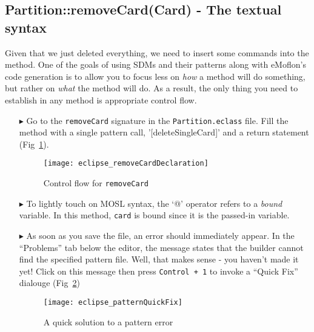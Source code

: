 \newpage
\hypertarget{remCard tex}{}
\subsection{Partition::removeCard(Card) - The textual syntax}
\texHeader

Given that we just deleted everything, we need to insert some commands into the method. One of the goals of using SDMs and their
patterns along with eMoflon's code generation is to allow you to focus less on \emph{how} a method will do something, but rather on \emph{what} the method will
do. As a result, the only thing you need to establish in any method is appropriate control flow.

\begin{itemize}

\item[$\blacktriangleright$] Go to the \texttt{removeCard} signature in the \texttt{Partition.eclass} file. Fill the method with a single pattern call,
'[deleteSingleCard]' and a return statement (Fig~\ref{fig:remCardDec}).

\begin{figure}[htp]
\begin{center}
  \texttt{[image: eclipse\_removeCardDeclaration]}
  \caption{Control flow for \texttt{removeCard}}
  \label{fig:remCardDec}
\end{center}
\end{figure}

\item[$\blacktriangleright$] To lightly touch on MOSL syntax, the `@' operator refers to a \emph{bound} variable. In this method, \texttt{card} is bound since
it is the passed-in variable.

\item[$\blacktriangleright$] As soon as you save the file, an error should immediately appear. In the ``Problems'' tab below the editor, the message states that
the builder cannot find the specified pattern file. Well, that makes sense - you haven't made it yet! Click on this message then press \texttt{Control + 1} to
invoke a ``Quick Fix'' dialouge (Fig~\ref{fig:quixFix})

\begin{figure}[htp]
\begin{center}
  \texttt{[image: eclipse\_patternQuickFix]}
  \caption{A quick solution to a pattern error}
  \label{fig:quixFix}
\end{center}
\end{figure}


\end{itemize}
